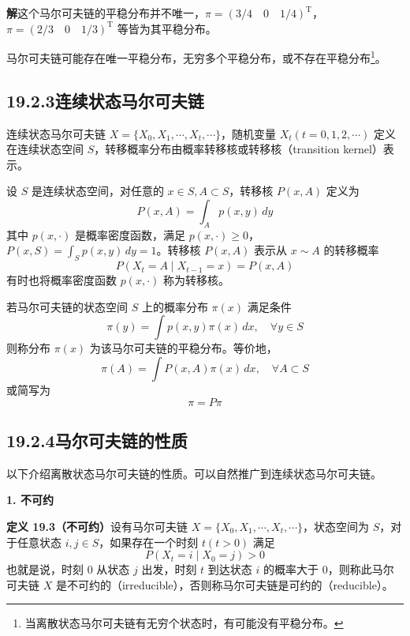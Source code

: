 \documentclass[UTF8, 12pt, fontset=fandol, oneside]{ctexart}
\begin{document}
\noindent\textbf{解}\quad 这个马尔可夫链的平稳分布并不唯一，$\pi=(3/4\quad 0\quad 1/4)^{\mathrm{T}}$，$\pi=(2/3\quad 0\quad 1/3)^{\mathrm{T}}$ 等皆为其平稳分布。

马尔可夫链可能存在唯一平稳分布，无穷多个平稳分布，或不存在平稳分布\footnote{当离散状态马尔可夫链有无穷个状态时，有可能没有平稳分布。}。

\subsection*{19.2.3\quad 连续状态马尔可夫链}

连续状态马尔可夫链 $X=\{X_0,X_1,\cdots,X_t,\cdots\}$，随机变量 $X_t(t=0,1,2,\cdots)$ 定义在连续状态空间 $S$，转移概率分布由概率转移核或转移核（transition kernel）表示。

设 $S$ 是连续状态空间，对任意的 $x\in S,A\subset S$，转移核 $P(x,A)$ 定义为
\begin{equation}
P(x,A)=\int_A p(x,y)\,dy
\tag{19.19}
\end{equation}
其中 $p(x,\cdot)$ 是概率密度函数，满足 $p(x,\cdot)\geqslant 0$，$P(x,S)=\int_S p(x,y)\,dy=1$。转移核 $P(x,A)$ 表示从 $x\sim A$ 的转移概率
\begin{equation}
P(X_t=A\mid X_{t-1}=x)=P(x,A)
\tag{19.20}
\end{equation}
有时也将概率密度函数 $p(x,\cdot)$ 称为转移核。

若马尔可夫链的状态空间 $S$ 上的概率分布 $\pi(x)$ 满足条件
\begin{equation}
\pi(y)=\int p(x,y)\pi(x)\,dx,\quad \forall y\in S
\tag{19.21}
\end{equation}
则称分布 $\pi(x)$ 为该马尔可夫链的平稳分布。等价地，
\begin{equation}
\pi(A)=\int P(x,A)\pi(x)\,dx,\quad \forall A\subset S
\tag{19.22}
\end{equation}
或简写为
\begin{equation}
\pi=P\pi
\tag{19.23}
\end{equation}

\subsection*{19.2.4\quad 马尔可夫链的性质}

以下介绍离散状态马尔可夫链的性质。可以自然推广到连续状态马尔可夫链。

\noindent\textbf{1. 不可约}

\noindent\textbf{定义 19.3（不可约）}\quad 设有马尔可夫链 $X=\{X_0,X_1,\cdots,X_t,\cdots\}$，状态空间为 $S$，对于任意状态 $i,j\in S$，如果存在一个时刻 $t(t>0)$ 满足
\begin{equation}
P(X_t=i\mid X_0=j)>0
\tag{19.24}
\end{equation}
也就是说，时刻 0 从状态 $j$ 出发，时刻 $t$ 到达状态 $i$ 的概率大于 0，则称此马尔可夫链 $X$ 是不可约的（irreducible），否则称马尔可夫链是可约的（reducible）。
\end{document}
